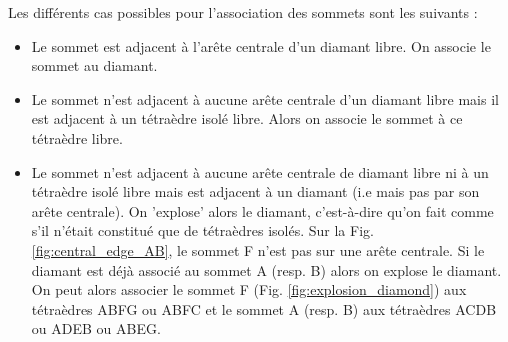 Les différents cas possibles pour l'association des sommets sont les suivants :\\
\begin{itemize}
\item Le sommet est adjacent à l'arête centrale d'un diamant libre. On associe le sommet au diamant.
\item Le sommet n'est adjacent à aucune arête centrale d'un diamant libre mais il est adjacent à un tétraèdre isolé libre. Alors on associe le sommet à ce tétraèdre libre.
\item Le sommet n'est adjacent à aucune arête centrale de diamant libre ni à un tétraèdre isolé libre mais est adjacent à un diamant (i.e mais pas par son arête centrale). On 'explose' alors le diamant, c'est-à-dire qu'on fait comme s'il n'était constitué que de tétraèdres isolés. Sur la Fig. \ref{fig:central_edge_AB}, le sommet F n'est pas sur une arête centrale. Si le diamant est déjà associé au sommet A (resp. B) alors on explose le diamant. On peut alors associer le sommet F (Fig. \ref{fig:explosion_diamond}) aux tétraèdres ABFG ou ABFC et le sommet A (resp. B) aux tétraèdres ACDB ou ADEB ou ABEG.\\
\end{itemize}

